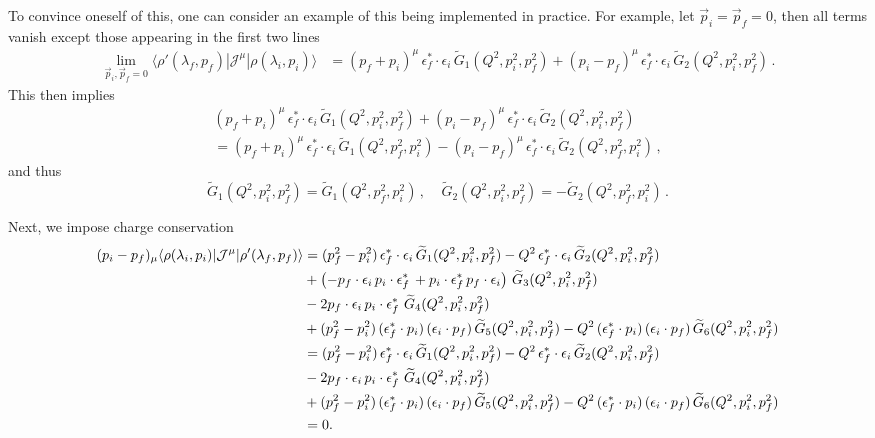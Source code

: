 To convince oneself of this, one can consider an example of this being implemented in practice. For example, let $\vec{p}_i=\vec{p}_f=0$, then all terms vanish except those appearing in the first two lines
\begin{align}
\lim_{\vec{p}_i,\vec{p}_f=0}\langle\rho'(\lambda_f,p_f)|{\mathcal{J}}^{\mu}|\rho(\lambda_i,p_i)\rangle
&=
(p_f+p_i)^\mu \,\epsilon_f^*\cdot \epsilon_i\, \widetilde{G}_1(Q^2,p_i^2,p_f^2)
+(p_i-p_f)^\mu \,\epsilon_f^*\cdot \epsilon_i\,\widetilde{G}_2(Q^2,p_i^2,p_f^2) \,.
\end{align} 
{\mh This then implies
\begin{multline}
(p_f+p_i)^\mu \,\epsilon_f^*\cdot \epsilon_i\, \widetilde{G}_1(Q^2,p_i^2,p_f^2)
+(p_i-p_f)^\mu \,\epsilon_f^*\cdot \epsilon_i\,\widetilde{G}_2(Q^2,p_i^2,p_f^2) \\[5pt]
= (p_f+p_i)^\mu \,\epsilon_f^*\cdot \epsilon_i\, \widetilde{G}_1(Q^2,p_f^2,p_i^2)
-(p_i-p_f)^\mu \,\epsilon_f^*\cdot \epsilon_i\,\widetilde{G}_2(Q^2,p_f^2,p_i^2) \,,
\end{multline} 
and thus
\begin{equation}
\widetilde{G}_1(Q^2,p_i^2,p_f^2) = \widetilde{G}_1(Q^2,p_f^2,p_i^2) \,, \ \ \ \ \ \widetilde{G}_2(Q^2,p_i^2,p_f^2) = - \widetilde{G}_2(Q^2,p_f^2,p_i^2) \,.
\end{equation}
}

 Next, we impose charge conservation
\begin{align}
(p_i-p_f)_\mu\langle\rho(\lambda_i,p_i)|{\mathcal{J}}^{\mu}|\rho'(\lambda_f,p_f)\rangle
&=
(p_f^2-p_i^2) \,\epsilon_f^*\cdot \epsilon_i\, \widetilde{G}_1(Q^2,p_i^2,p_f^2)
-Q^2 \,\epsilon_f^*\cdot \epsilon_i\,\widetilde{G}_2(Q^2,p_i^2,p_f^2)
\nonumber\\&
+
\left(-p_f\cdot\epsilon_i\, p_i\cdot \epsilon_f^*\,+p_i\cdot\epsilon_f^{*}\, p_f\cdot \epsilon_i\right)
\,\widetilde{G}_3(Q^2,p_i^2,p_f^2)
\nonumber\\&
-2p_f\cdot\epsilon_i\, p_i\cdot \epsilon_f^*\,
\,\widetilde{G}_4(Q^2,p_i^2,p_f^2)
\nonumber\\
&+(p_f^2-p_i^2) \,(\epsilon_f^*\cdot p_i)\,(\epsilon_i\cdot p_f)\,\widetilde{G}_5(Q^2,p_i^2,p_f^2)
-Q^2 \,(\epsilon_f^*\cdot p_i)\,(\epsilon_i\cdot p_f)\,\widetilde{G}_6(Q^2,p_i^2,p_f^2)
\nonumber\\
&=
(p_f^2-p_i^2) \,\epsilon_f^*\cdot \epsilon_i\, \widetilde{G}_1(Q^2,p_i^2,p_f^2)
-Q^2 \,\epsilon_f^*\cdot \epsilon_i\,\widetilde{G}_2(Q^2,p_i^2,p_f^2)
\nonumber\\
&-2p_f\cdot\epsilon_i\, p_i\cdot \epsilon_f^*\,
\,\widetilde{G}_4(Q^2,p_i^2,p_f^2)
\nonumber\\&
+(p_f^2-p_i^2) \,(\epsilon_f^*\cdot p_i)\,(\epsilon_i\cdot p_f)\,\widetilde{G}_5(Q^2,p_i^2,p_f^2)
-Q^2 \,(\epsilon_f^*\cdot p_i)\,(\epsilon_i\cdot p_f)\,\widetilde{G}_6(Q^2,p_i^2,p_f^2)
\nonumber\\
&=0.
\label{eq:charge_cons_rho}
\end{align}

